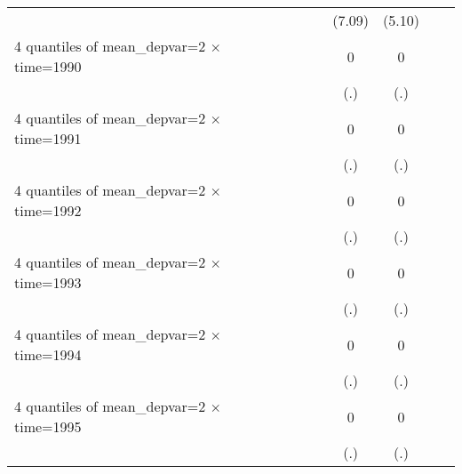 \begin{table}[htbp]
\begin{tabular}{l*{6}{c}}
                    &                     &                     &      (7.09)         &      (5.10)         &                     &                     \\
[1em]
4 quantiles of mean\_depvar=2 $\times$ time=1990&                     &                     &           0         &           0         &                     &                     \\
                    &                     &                     &         (.)         &         (.)         &                     &                     \\
[1em]
4 quantiles of mean\_depvar=2 $\times$ time=1991&                     &                     &           0         &           0         &                     &                     \\
                    &                     &                     &         (.)         &         (.)         &                     &                     \\
[1em]
4 quantiles of mean\_depvar=2 $\times$ time=1992&                     &                     &           0         &           0         &                     &                     \\
                    &                     &                     &         (.)         &         (.)         &                     &                     \\
[1em]
4 quantiles of mean\_depvar=2 $\times$ time=1993&                     &                     &           0         &           0         &                     &                     \\
                    &                     &                     &         (.)         &         (.)         &                     &                     \\
[1em]
4 quantiles of mean\_depvar=2 $\times$ time=1994&                     &                     &           0         &           0         &                     &                     \\
                    &                     &                     &         (.)         &         (.)         &                     &                     \\
[1em]
4 quantiles of mean\_depvar=2 $\times$ time=1995&                     &                     &           0         &           0         &                     &                     \\
                    &                     &                     &         (.)         &         (.)         &                     &                     \\

\end{tabular}
\end{table}
